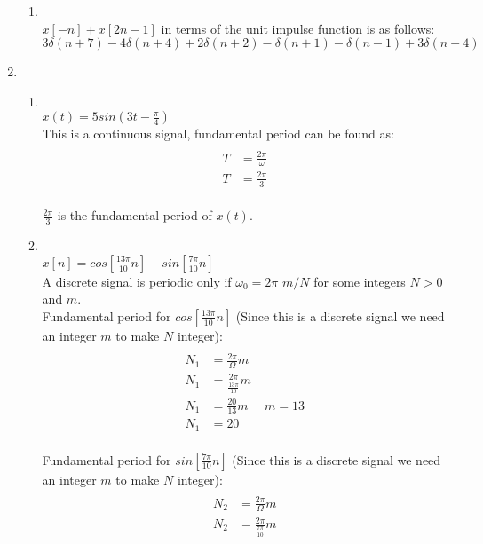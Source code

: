 \documentclass[10pt,a4paper, margin=1in]{article}
\begin{document}
\begin{enumerate}
\begin{enumerate}
    \item %
        \\ $x[-n] + x[2n-1]$ in terms of the unit impulse function is as follows:   
        \\ $3\delta(n+7)-4\delta(n+4)+2\delta(n+2)-\delta(n+1)-\delta(n-1)+3\delta(n-4)$
    \end{enumerate}
    
\newpage
\item %
    \begin{enumerate}   
    \item %
        \\$x(t) = 5sin(3t - \frac{\pi}{4})$ 
        \\This is a continuous signal, fundamental period can be found as:
        \begin{align*}
        \\T&=\frac{2\pi}{\omega} 
        \\T&=\frac{2\pi}{3}  
        \end{align*}
        \\$\frac{2\pi}{3}$ is the fundamental period of $x(t)$.
        \\
    \item %
        \\$x[n] = cos[\frac{13\pi}{10}n] + sin[\frac{7\pi}{10}n ]$ 
        \\ A discrete signal is periodic only if $\omega_0 = 2\pi$ $m/N$ for some integers $N>0$ and $m$.
        \\Fundamental period for $cos[\frac{13\pi}{10}n]$ (Since this is a discrete signal we need an integer $m$ to make $N$ integer):
        \begin{align*}
            \\N_1&=\frac{2\pi}{\Omega}m 
            \\N_1&=\frac{2\pi}{\frac{13\pi}{10}}m 
            \\N_1&=\frac{20}{13}m \ \ \ \ \ \ m = 13 
            \\N_1&=20
        \end{align*}
        \\Fundamental period for $sin[\frac{7\pi}{10}n]$ (Since this is a discrete signal we need an integer $m$ to make $N$ integer):
        \begin{align*}
            \\N_2&=\frac{2\pi}{\Omega}m 
            \\N_2&=\frac{2\pi}{\frac{7\pi}{10}}m 

\end{align*}
\end{enumerate}
\end{enumerate}
\end{document}
